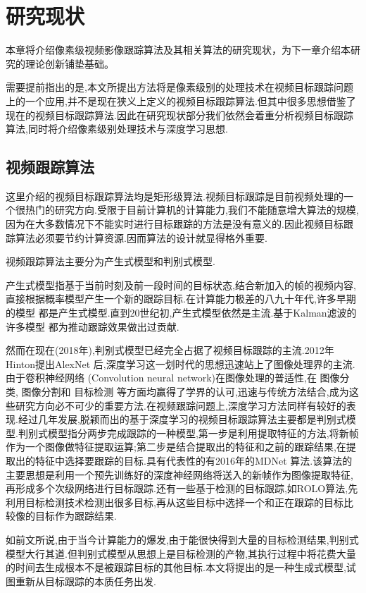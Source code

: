 \chapter{研究现状}
本章将介绍像素级视频影像跟踪算法及其相关算法的研究现状，为下一章介绍本研究的理论创新铺垫基础。
\par
需要提前指出的是,本文所提出方法将是像素级别的处理技术在视频目标跟踪问题上的一个应用,并不是现在狭义上定义的视频目标跟踪算法.但其中很多思想借鉴了现在的视频目标跟踪算法.因此在研究现状部分我们依然会着重分析视频目标跟踪算法,同时将介绍像素级别处理技术与深度学习思想.

\section{视频跟踪算法}
这里介绍的视频目标跟踪算法均是矩形级算法.视频目标跟踪是目前视频处理的一个很热门的研究方向.受限于目前计算机的计算能力,我们不能随意增大算法的规模,因为在大多数情况下不能实时进行目标跟踪的方法是没有意义的.因此视频目标跟踪算法必须要节约计算资源.因而算法的设计就显得格外重要.
\par
视频跟踪算法主要分为产生式模型和判别式模型.
\par
产生式模型指基于当前时刻及前一段时间的目标状态,结合新加入的帧的视频内容,直接根据概率模型产生一个新的跟踪目标.在计算能力极差的八九十年代,许多早期的模型
\supercite{schalkoff1982model}
都是产生式模型.直到20世纪初,产生式模型依然是主流.基于Kalman滤波的许多模型
\supercite{kim2002fast, weng2006video, comaniciu2003kernel}
都为推动跟踪效果做出过贡献.
\par
然而在现在(2018年),判别式模型已经完全占据了视频目标跟踪的主流.2012年Hinton提出AlexNet 
\supercite{krizhevsky2012imagenet} 
后,深度学习这一划时代的思想迅速站上了图像处理界的主流.由于卷积神经网络
\supercite{krizhevsky2012imagenet} 
(Convolution neural network)在图像处理的普适性,在
图像分类\supercite{krizhevsky2012imagenet, witten2016data, he2016deep},
图像分割\supercite{long2015fully}和
目标检测\supercite{ren2015faster, redmon2016you}
等方面均赢得了学界的认可,迅速与传统方法结合,成为这些研究方向必不可少的重要方法.在视频跟踪问题上,深度学习方法同样有较好的表现.经过几年发展,脱颖而出的基于深度学习的视频目标跟踪算法主要都是判别式模型.判别式模型指分两步完成跟踪的一种模型,第一步是利用提取特征的方法,将新帧作为一个图像做特征提取运算;第二步是结合提取出的特征和之前的跟踪结果,在提取出的特征中选择要跟踪的目标.具有代表性的有2016年的MDNet \supercite{nam2016mdnet}算法.该算法的主要思想是利用一个预先训练好的深度神经网络将送入的新帧作为图像提取特征,再形成多个次级网络进行目标跟踪.还有一些基于检测的目标跟踪,如ROLO\supercite{ning2016spatially}算法,先利用目标检测技术检测出很多目标,再从这些目标中选择一个和正在跟踪的目标比较像的目标作为跟踪结果.
\par
如前文所说,由于当今计算能力的爆发,由于能很快得到大量的目标检测结果,判别式模型大行其道.但判别式模型从思想上是目标检测的产物,其执行过程中将花费大量的时间去生成根本不是被跟踪目标的其他目标.本文将提出的是一种生成式模型,试图重新从目标跟踪的本质任务出发.

